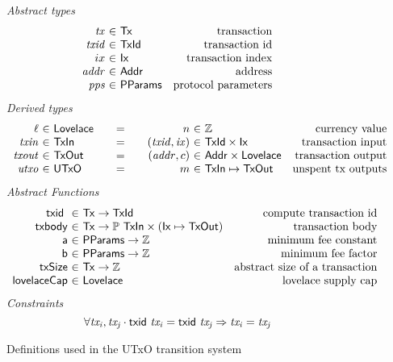 \begin{figure*}[htb]
  \emph{Abstract types}
  \begin{equation*}
    \begin{array}{r@{~\in~}lr}
      \var{tx} & \Tx & \text{transaction}\\
      \var{txid} & \TxId & \text{transaction id}\\
      ix & \Ix & \text{transaction index}\\
      \var{addr} & \Addr & \text{address}\\
      \var{pps} & \PPMMap & \text{protocol parameters}
    \end{array}
  \end{equation*}
  \emph{Derived types}
  \begin{equation*}
    \begin{array}{r@{~\in~}l@{\qquad=\qquad}r@{~\in~}lr}
      \ell & \Lovelace
      & n  & \mathbb{Z}
      & \text{currency value}
      \\
      \var{txin}
      & \TxIn
      & (\var{txid}, \var{ix})
      & \TxId \times \Ix
      & \text{transaction input}
      \\
      \var{txout}
      & \type{TxOut}
      & (\var{addr}, c)
      & \Addr \times \Lovelace
      & \text{transaction output}
      \\
      \var{utxo}
      & \UTxO
      & m
      & \TxIn \mapsto \TxOut
      & \text{unspent tx outputs}
    \end{array}
  \end{equation*}
  \emph{Abstract Functions}
  \begin{equation*}
    \begin{array}{r@{~\in~}lr}
      \txid{} & \Tx \to \TxId & \text{compute transaction id}\\
      \fun{txbody} & \Tx \to \powerset{\TxIn} \times (\Ix \mapsto \TxOut)
                                  & \text{transaction body}\\
      \fun{a} & \PPMMap \to \mathbb{Z} & \text{minimum fee constant}\\
      \fun{b} & \PPMMap \to \mathbb{Z} & \text{minimum fee factor}\\
      \fun{txSize} & \Tx \to \mathbb{Z} & \text{abstract size of a transaction}\\
      \fun{lovelaceCap} & \Lovelace & \text{lovelace supply cap}
    \end{array}
  \end{equation*}
  \emph{Constraints}
  \begin{equation}
    \label{eq:txid-injective}
    \forall \mathit{tx_i}, \mathit{tx_j} \cdot
    \mathsf{txid}~ \mathit{\mathit{tx_i}} = \mathsf{txid}~ \mathit{\mathit{tx_j}} \Rightarrow \mathit{tx_i} = \mathit{tx_j}
  \end{equation}
  \caption{Definitions used in the UTxO transition system}
  \label{fig:defs:utxo}
\end{figure*}

